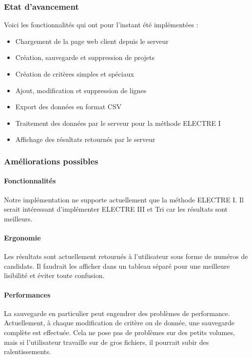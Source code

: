 \documentclass[a4paper]{article}
\begin{document}
\subsubsection{Etat d'avancement}

Voici les fonctionnalités qui ont pour l'instant été implémentées :

\begin{itemize}
\item Chargement de la page web client depuis le serveur
\item Création, sauvegarde et suppression de projets
\item Création de critères simples et spéciaux
\item Ajout, modification et suppression de lignes
\item Export des données en format CSV
\item Traitement des données par le serveur pour la méthode ELECTRE I
\item Affichage des résultats retournés par le serveur
\end{itemize}

\subsubsection{Améliorations possibles}

\paragraph{Fonctionnalités} Notre implémentation ne supporte actuellement que la méthode ELECTRE I. Il serait intéressant d'implémenter ELECTRE III et Tri car les résultats sont meilleurs.

\paragraph{Ergonomie} Les résultats sont actuellement retournés à l'utilisateur sous forme de numéros de candidats. Il faudrait les afficher dans un tableau séparé pour une meilleure lisibilité et éviter toute confusion.

\paragraph{Performances} La sauvegarde en particulier peut engendrer des problèmes de performance. Actuellement, à chaque modification de critère ou de donnée, une sauvegarde complète est effectuée. Cela ne pose pas de problèmes sur des petits volumes, mais si l'utilisateur travaille sur de gros fichiers, il pourrait subir des ralentissements.
\end{document}
